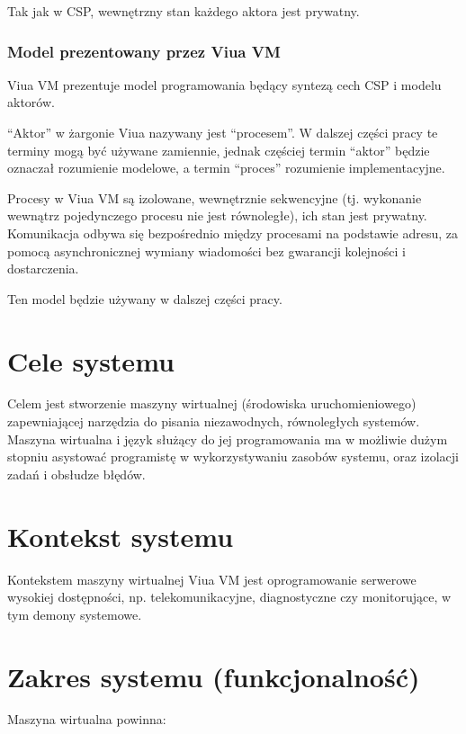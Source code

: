\documentclass[11pt,oneside,a4paper,titlepage,onecolumn]{article}
\begin{document}
Tak jak w CSP, wewnętrzny stan każdego aktora jest prywatny.

\subsubsection{Model prezentowany przez Viua VM}

Viua VM prezentuje model programowania będący syntezą cech CSP i modelu aktorów.

``Aktor'' w żargonie Viua nazywany jest ``procesem''. W dalszej części pracy te terminy mogą być używane
zamiennie, jednak częściej termin ``aktor'' będzie oznaczał rozumienie modelowe, a termin ``proces''
rozumienie implementacyjne.

Procesy w Viua VM są izolowane, wewnętrznie sekwencyjne (tj. wykonanie wewnątrz pojedynczego procesu nie
jest równoległe), ich stan jest prywatny.
Komunikacja odbywa się bezpośrednio między procesami na podstawie adresu, za pomocą asynchronicznej wymiany
wiadomości bez gwarancji kolejności i dostarczenia.

Ten model będzie używany w dalszej części pracy.


\section{Cele systemu}

Celem jest stworzenie maszyny wirtualnej (środowiska uruchomieniowego) zapewniającej narzędzia do
pisania niezawodnych, równoległych systemów. Maszyna wirtualna i język służący do jej programowania
ma w możliwie dużym stopniu asystować programistę w wykorzystywaniu zasobów systemu, oraz
izolacji zadań i obsłudze błędów.

\section{Kontekst systemu}

Kontekstem maszyny wirtualnej Viua VM jest oprogramowanie serwerowe wysokiej dostępności, np.
telekomunikacyjne, diagnostyczne czy monitorujące, w tym demony systemowe.

\section{Zakres systemu (funkcjonalność)}

Maszyna wirtualna powinna:
\end{document}
